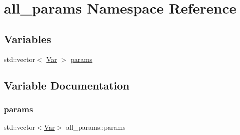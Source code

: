 \hypertarget{namespaceall__params}{}\section{all\+\_\+params Namespace Reference}
\label{namespaceall__params}
\subsection*{Variables}
\begin{DoxyCompactItemize}
\item 
std\+::vector$<$ \hyperlink{struct_var}{Var} $>$ \hyperlink{namespaceall__params_a925d27c82562242237a980dc8c86bc4a}{params}
\end{DoxyCompactItemize}


\subsection{Variable Documentation}
\mbox{\label{namespaceall__params_a925d27c82562242237a980dc8c86bc4a}} 
\subsubsection{\texorpdfstring{params}{params}}
{\footnotesize\ttfamily std\+::vector$<$\hyperlink{struct_var}{Var}$>$ all\+\_\+params\+::params}

